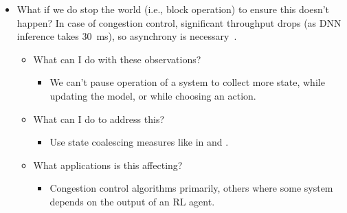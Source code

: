 \documentclass[sigconf,natbib=false]{acmart}
\begin{document}
\begin{itemize}
	\item What if we do stop the world (i.e., block operation) to ensure this doesn't happen? In case of congestion control, significant throughput drops (as DNN inference takes \SI{30}{\milli\second}), so asynchrony is necessary~\cite{DBLP:journals/corr/abs-1910-04054}.
	\begin{itemize}
		\item What can I do with these observations?
		\begin{itemize}
			\item We can't pause operation of a system to collect more state, while updating the model, or while choosing an action.
		\end{itemize}
		\item What can I do to address this?
		\begin{itemize}
			\item Use state coalescing measures like in \textcite{DBLP:journals/tnsm/SimpsonRP20} and \textcite{DBLP:journals/corr/abs-1910-04054}.
		\end{itemize}
		\item What applications is this affecting?
		\begin{itemize}
			\item Congestion control algorithms primarily, others where some system depends on the output of an RL agent.
		\end{itemize}
	\end{itemize}
	

\end{itemize}
\end{document}
